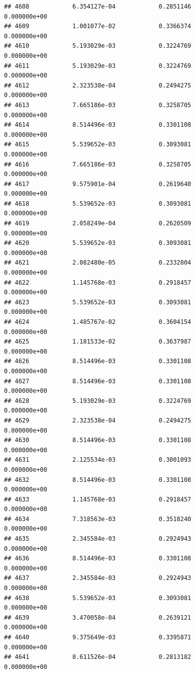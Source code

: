 \documentclass[
]{article}
\begin{document}
\begin{verbatim}
## 4608            6.354127e-04            0.2851146            0.000000e+00
## 4609            1.001077e-02            0.3366374            0.000000e+00
## 4610            5.193029e-03            0.3224769            0.000000e+00
## 4611            5.193029e-03            0.3224769            0.000000e+00
## 4612            2.323538e-04            0.2494275            0.000000e+00
## 4613            7.665186e-03            0.3258705            0.000000e+00
## 4614            8.514496e-03            0.3301108            0.000000e+00
## 4615            5.539652e-03            0.3093081            0.000000e+00
## 4616            7.665186e-03            0.3258705            0.000000e+00
## 4617            9.575901e-04            0.2619640            0.000000e+00
## 4618            5.539652e-03            0.3093081            0.000000e+00
## 4619            2.058249e-04            0.2620509            0.000000e+00
## 4620            5.539652e-03            0.3093081            0.000000e+00
## 4621            2.082480e-05            0.2332804            0.000000e+00
## 4622            1.145768e-03            0.2918457            0.000000e+00
## 4623            5.539652e-03            0.3093081            0.000000e+00
## 4624            1.485767e-02            0.3604154            0.000000e+00
## 4625            1.181533e-02            0.3637987            0.000000e+00
## 4626            8.514496e-03            0.3301108            0.000000e+00
## 4627            8.514496e-03            0.3301108            0.000000e+00
## 4628            5.193029e-03            0.3224769            0.000000e+00
## 4629            2.323538e-04            0.2494275            0.000000e+00
## 4630            8.514496e-03            0.3301108            0.000000e+00
## 4631            2.125534e-03            0.3001093            0.000000e+00
## 4632            8.514496e-03            0.3301108            0.000000e+00
## 4633            1.145768e-03            0.2918457            0.000000e+00
## 4634            7.318563e-03            0.3518240            0.000000e+00
## 4635            2.345584e-03            0.2924943            0.000000e+00
## 4636            8.514496e-03            0.3301108            0.000000e+00
## 4637            2.345584e-03            0.2924943            0.000000e+00
## 4638            5.539652e-03            0.3093081            0.000000e+00
## 4639            3.470058e-04            0.2639121            0.000000e+00
## 4640            9.375649e-03            0.3395871            0.000000e+00
## 4641            8.611526e-04            0.2813182            0.000000e+00

\end{verbatim}
\end{document}
